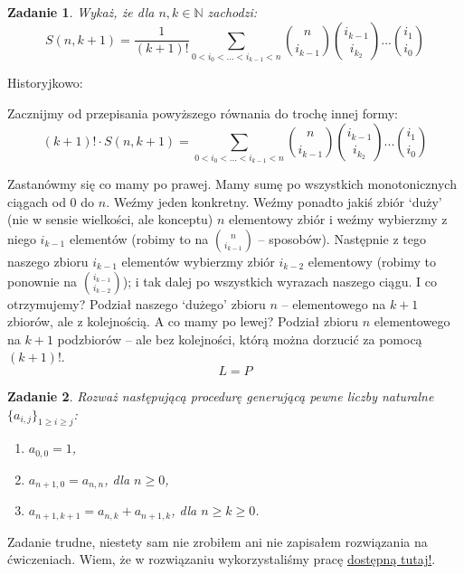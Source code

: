 \documentclass{mwbk}
\newtheorem{zad}{Zadanie}[chapter]
\begin{document}
\begin{zad}
    Wykaż, że dla $n, k \in \mathbb{N}$ zachodzi:
    \[S(n,k+1)=\frac{1}{(k+1)!} \sum_{0<i_0<...<i_{k-1}<n} \binom{n}{i_{k-1}}\binom{i_{k-1}}{i_{k_2}}...\binom{i_1}{i_0}     \]
\end{zad}
\begin{mdframed}
    Historyjkowo:

    Zacznijmy od przepisania powyższego równania do trochę innej formy:
    \[(k+1)! \cdot S(n,k+1) = \sum_{0<i_0<...<i_{k-1}<n} \binom{n}{i_{k-1}}\binom{i_{k-1}}{i_{k_2}}...\binom{i_1}{i_0}     \]

    Zastanówmy się co mamy po prawej. Mamy sumę po wszystkich monotonicznych ciągach od $0$ do $n$.
    Weźmy jeden konkretny. Weźmy ponadto jakiś zbiór `duży' (nie w sensie wielkości, ale konceptu) $n$ elementowy
    zbiór i weźmy wybierzmy z niego $i_{k-1}$ elementów (robimy to na $\binom{n}{i_{k-1}}$ -- sposobów).
    Następnie z tego naszego zbioru $i_{k-1}$ elementów wybierzmy zbiór $i_{k-2}$ elementowy
    (robimy to ponownie na $\binom{i_{k-1}}{i_{k-2}}$); i tak dalej po wszystkich wyrazach naszego ciągu.
    I co otrzymujemy? Podział naszego `dużego' zbioru $n$ -- elementowego na $k+1$ zbiorów, ale z kolejnością.
    A co mamy po lewej? Podział zbioru $n$ elementowego na $k+1$ podzbiorów -- ale bez kolejności, którą można
    dorzucić za pomocą $(k+1)!$.
    \[
        L=P
    \]


\end{mdframed}





\begin{zad}
    Rozważ  następującą procedurę generującą pewne liczby naturalne
    $\{a_{i,j}\}_{1 \geq i \geq j}$:
    \begin{enumerate}
        \item $a_{0,0} = 1$,
        \item $a_{n+1, 0} = a_{n,n}$, dla $n \geq 0$,
        \item $a_{n+1, k+1} = a_{n, k} + a_{n+1, k}$, dla $n \geq k \geq 0$.
    \end{enumerate}
\end{zad}
\begin{mdframed}
    Zadanie trudne, niestety sam nie zrobiłem ani nie zapisałem rozwiązania na ćwiczeniach.
    Wiem, że w rozwiązaniu wykorzystaliśmy pracę \href{https://www.sciencedirect.com/science/article/pii/S0195669810001502}{dostępną tutaj!}.
\end{mdframed}
\end{document}
